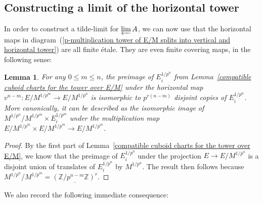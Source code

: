 \documentclass[10pt,oneside]{amsart}
\newtheorem{lemma}[theorem]{Lemma}
\theoremstyle{definition}
\begin{document}
	\subsection{Constructing a limit of the horizontal tower}
	In order to construct a tilde-limit for $\varprojlim A$, we can now use that the horizontal maps in diagram~(\ref{p-multiplication tower of E/M splits into vertical and horizontal tower}) are all finite \'etale. They are even finite covering maps, in the following sense:
	\begin{lemma}\label{horizontal map is covering map}
		For any $0\leq m\leq n$, the preimage of $E_i^{1/p^n}$ from Lemma~\ref{compatible cuboid charts for the tower over E/M} under the horizontal map $v^{n-m}:E/M^{1/p^{m}}\rightarrow E/M^{1/p^n}$ is isomorphic to $p^{r(n-m)}$ disjoint copies of $E_i^{1/p^n}$. More canonically, it can be described as the isomorphic image of $M^{1/p^n}/M^{1/p^m}\times E_i^{1/p^m}$ under the multiplication map $E/M^{1/p^m}\times E/M^{1/p^m}\rightarrow E/M^{1/p^m}$.
	\end{lemma}
	\begin{proof}
		By the first part of Lemma~\ref{compatible cuboid charts for the tower over E/M}, we know that the preimage of $E_i^{1/p^n}$ under the projection $E\rightarrow E/M^{1/p^n}$ is a disjoint union of translates of $E_i^{1/p^n}$ by $M^{1/p^{n}}$. The result then follows because $M^{1/p^{n}}/M^{1/p^{m}} =  \underline{(\mathbb Z/p^{n-m}\mathbb Z)^r}$.
	\end{proof}
	We also record the following immediate consequence:
	
\end{document}
